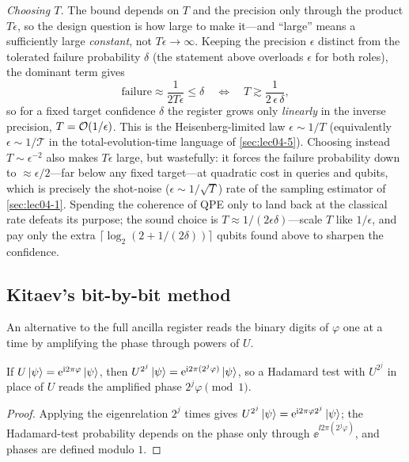 \emph{Choosing $T$.} The bound depends on $T$ and the precision only through the
product $T\epsilon$, so the design question is how large to make it---and ``large''
means a sufficiently large \emph{constant}, not $T\epsilon\to\infty$. Keeping the
precision $\epsilon$ distinct from the tolerated failure probability $\delta$ (the
statement above overloads $\epsilon$ for both roles), the dominant term gives
\[
  \text{failure}\approx\frac{1}{2T\epsilon}\le\delta
  \quad\Longleftrightarrow\quad
  T\gtrsim\frac{1}{2\,\epsilon\,\delta},
\]
so for a fixed target confidence $\delta$ the register grows only \emph{linearly} in
the inverse precision, $T=\mathcal{O}(1/\epsilon)$. This is the Heisenberg-limited law
$\epsilon\sim1/T$ (equivalently $\epsilon\sim1/\mathcal{T}$ in the
total-evolution-time language of \cref{sec:lec04-5}). Choosing instead
$T\sim\epsilon^{-2}$ also makes $T\epsilon$ large, but wastefully: it forces the
failure probability down to $\approx\epsilon/2$---far below any fixed target---at
quadratic cost in queries and qubits, which is precisely the shot-noise
($\epsilon\sim1/\sqrt{T}$) rate of the sampling estimator of \cref{sec:lec04-1}.
Spending the coherence of QPE only to land back at the classical rate defeats its
purpose; the sound choice is $T\approx1/(2\epsilon\delta)$---scale $T$ like $1/\epsilon$,
and pay only the extra $\lceil\log_2(2+1/(2\delta))\rceil$ qubits found above to
sharpen the confidence.

\subsection*{Kitaev's bit-by-bit method}

An alternative to the full ancilla register reads the binary digits of $\varphi$
one at a time by amplifying the phase through powers of $U$.

\begin{lemma}
\label{lem:lec04-amplify}
If $U\ket{\psi}=\mathrm{e}^{\mathrm{i} 2\pi\varphi}\ket{\psi}$, then
$U^{2^{j}}\ket{\psi}=\mathrm{e}^{\mathrm{i} 2\pi(2^{j}\varphi)}\ket{\psi}$, so a Hadamard test
with $U^{2^{j}}$ in place of $U$ reads the amplified phase $2^{j}\varphi\pmod1$.
\end{lemma}

\begin{proof}
Applying the eigenrelation $2^{j}$ times gives $U^{2^{j}}\ket{\psi}
=\mathrm{e}^{\mathrm{i} 2\pi\varphi 2^{j}}\ket{\psi}$; the Hadamard-test probability depends on
the phase only through $\ee^{\ii 2\pi(2^{j}\varphi)}$, and phases are defined
modulo $1$.
\end{proof}

